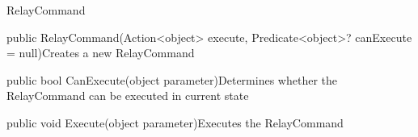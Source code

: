\begin{class}{RelayCommand}



	\begin{constructors}
        \begin{constructor}{public RelayCommand(Action<object> execute, Predicate<object>? canExecute = null)}{Creates a new RelayCommand}
        \begin{parameters}
            \end{parameters}
        \end{constructor}
     \end{constructors}
    
    
    \begin{methods}
    	\begin{method}{public bool CanExecute(object parameter)}{Determines whether the RelayCommand can be executed in current state}
            \begin{parameters}
            \end{parameters}
        \end{method}
        \begin{method}{public void Execute(object parameter)}{Executes the RelayCommand}
            \begin{parameters}
            \end{parameters}
        \end{method}
        
    \end{methods}

\end{class}


